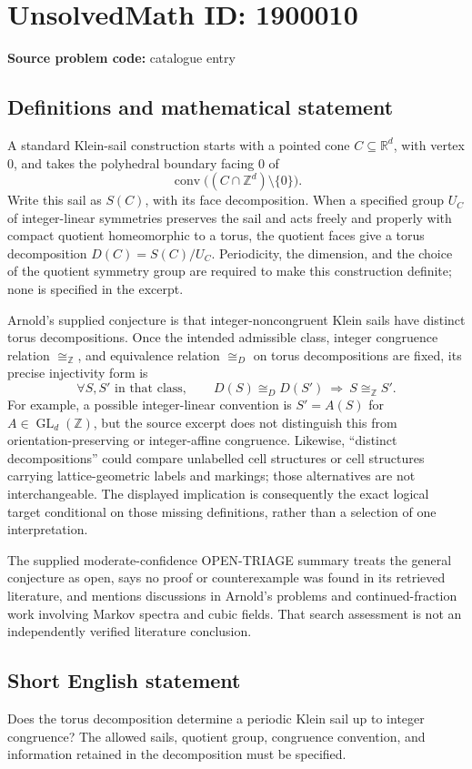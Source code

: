 \documentclass[11pt]{article}
\newcommand{\Z}{\mathbb{Z}}
\newcommand{\R}{\mathbb{R}}
\begin{document}
\section*{UnsolvedMath ID: 1900010}
\textbf{Source problem code:} catalogue entry
\subsection{Definitions and mathematical statement}
A standard Klein-sail construction starts with a pointed cone \(C\subseteq\R^d\), with vertex \(0\), and takes the polyhedral boundary facing \(0\) of
\[
\operatorname{conv}\bigl((C\cap\Z^d)\setminus\{0\}\bigr).
\]
Write this sail as \(S(C)\), with its face decomposition. When a specified group \(U_C\) of integer-linear symmetries preserves the sail and acts freely and properly with compact quotient homeomorphic to a torus, the quotient faces give a torus decomposition \(D(C)=S(C)/U_C\). Periodicity, the dimension, and the choice of the quotient symmetry group are required to make this construction definite; none is specified in the excerpt.

Arnold's supplied conjecture is that integer-noncongruent Klein sails have distinct torus decompositions. Once the intended admissible class, integer congruence relation \(\cong_{\Z}\), and equivalence relation \(\cong_D\) on torus decompositions are fixed, its precise injectivity form is
\[
\forall S,S'\text{ in that class},\qquad
D(S)\cong_D D(S')\ \Longrightarrow\ S\cong_{\Z}S'.
\]
For example, a possible integer-linear convention is \(S'=A(S)\) for \(A\in\operatorname{GL}_d(\Z)\), but the source excerpt does not distinguish this from orientation-preserving or integer-affine congruence. Likewise, ``distinct decompositions'' could compare unlabelled cell structures or cell structures carrying lattice-geometric labels and markings; those alternatives are not interchangeable. The displayed implication is consequently the exact logical target conditional on those missing definitions, rather than a selection of one interpretation.

The supplied moderate-confidence OPEN-TRIAGE summary treats the general conjecture as open, says no proof or counterexample was found in its retrieved literature, and mentions discussions in Arnold's problems and continued-fraction work involving Markov spectra and cubic fields. That search assessment is not an independently verified literature conclusion.
\subsection{Short English statement}
Does the torus decomposition determine a periodic Klein sail up to integer congruence? The allowed sails, quotient group, congruence convention, and information retained in the decomposition must be specified.
\end{document}
